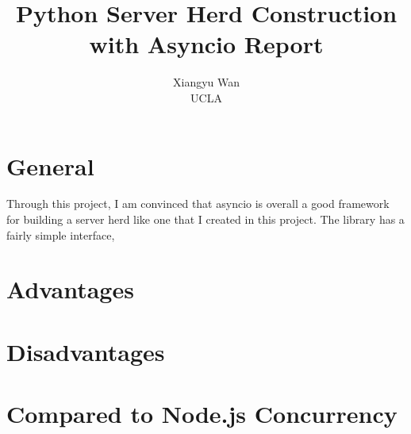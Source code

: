 \documentclass[letterpaper,twocolumn,10pt]{article}
\begin{document}

\date{}

\title{\Large \bf Python Server Herd Construction with Asyncio Report}

\author{
{\rm Xiangyu Wan}\\
UCLA
} %

\maketitle


\section{General}

Through this project, I am convinced that asyncio is overall a good framework for building a server herd like one that I created in this project.
The library has a fairly simple interface, 

\section{Advantages}



\section{Disadvantages}



\section{Compared to Node.js Concurrency}




% 

\end{document}
